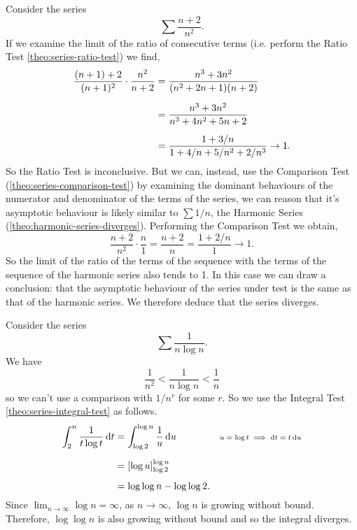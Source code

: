 \documentclass[../MathsNotesBase.tex]{subfiles}
\begin{document}
{\begin{exe}
			\bigskip
			\ex Consider the series
				\[ \sum \frac{n + 2}{n^2}. \]
				If we examine the limit of the ratio of consecutive terms (i.e. perform the Ratio Test \autoref{theo:series-ratio-test}) we find, 
				\[\begin{aligned}
					\frac{(n+1) + 2}{(n+1)^2} \cdot \frac{n^2}{n+2} &= \frac{n^3 + 3n^2}{(n^2 + 2n + 1)(n + 2)} \nn
					&= \frac{n^3 + 3n^2}{n^3 + 4n^2 + 5n + 2} \nn
					&= \frac{1 + 3/n}{1 + 4/n + 5/n^2 + 2/n^3} \to 1.
				\end{aligned}\]
				So the Ratio Test is inconclusive. But we can, instead, use the Comparison Test (\autoref{theo:series-comparison-test}) by examining the dominant behaviours of the numerator and denominator of the terms of the series, we can reason that it's asymptotic behaviour is likely similar to ${ \sum 1/n }$, the Harmonic Series (\autoref{theo:harmonic-series-diverges}). Performing the Comparison Test we obtain,
				\[ \frac{n + 2}{n^2} \cdot \frac{n}{1} = \frac{n + 2}{n} = \frac{1 + 2/n}{1} \to 1. \]
				So the limit of the ratio of the terms of the sequence with the terms of the sequence of the harmonic series also tends to 1. In this case we can draw a conclusion: that the asymptotic behaviour of the series under test is the same as that of the harmonic series. We therefore deduce that the series diverges.
			
			\bigskip
			\ex Consider the series
				\[ \sum \frac{1}{n\log{n}}. \]
				We have
				\[ \frac{1}{n^2} < \frac{1}{n\log{n}} < \frac{1}{n} \]
				so we can't use a comparison with ${ 1/n^r }$ for some $r$. So we use the Integral Test \autoref{theo:series-integral-test} as follows.				
				\[\begin{aligned}
					\int_2^n \frac{1}{t\log{t}} \dif t &= \int_{\log{2}}^{\log{n}} \frac{1}{u} \dif u &\sidecomment{${ u = \log{t} \implies \dif t = t \dif u }$} \nn
					&= [\log{u}]_{\log{2}}^{\log{n}} \nn
					&= \log{\log{n}} - \log{\log{2}}.
				\end{aligned}\]
				Since ${ \lim_{n \to \infty} \log{n} = \infty }$, as ${ n \to \infty }$, $\log{n}$ is growing without bound. Therefore, ${ \log{\log{n}} }$ is also growing without bound and so the integral diverges.
		\end{exe}
	}

	
\end{document}
